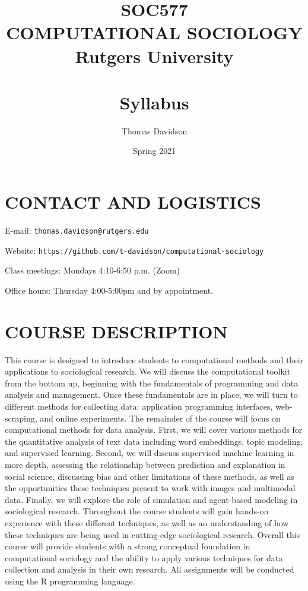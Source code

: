 \documentclass[
  10pt,
]{article}
\title{SOC577\\
\hspace*{0.333em}COMPUTATIONAL SOCIOLOGY\\
Rutgers University\\
~\\
\hspace*{0.333em}Syllabus}
\author{Thomas Davidson}
\date{Spring 2021}
\begin{document}
\maketitle

\hypertarget{contact-and-logistics}{%
\section{CONTACT AND LOGISTICS}\label{contact-and-logistics}}

E-mail: \texttt{thomas.davidson@rutgers.edu}

Website: \texttt{https://github.com/t-davidson/computational-sociology}

Class meetings: Mondays 4:10-6:50 p.m. (Zoom)

Office hours: Thursday 4:00-5:00pm and by appointment.

\hypertarget{course-description}{%
\section{COURSE DESCRIPTION}\label{course-description}}

This course is designed to introduce students to computational methods
and their applications to sociological research. We will discuss the
computational toolkit from the bottom up, beginning with the
fundamentals of programming and data analysis and management. Once these
fundamentals are in place, we will turn to different methods for
collecting data: application programming interfaces, web-scraping, and
online experiments. The remainder of the course will focus on
computational methods for data analysis. First, we will cover various
methods for the quantitative analysis of text data including word
embeddings, topic modeling, and supervised learning. Second, we will
discuss supervised machine learning in more depth, assessing the
relationship between prediction and explanation in social science,
discussing bias and other limitations of these methods, as well as the
opportunities these techniques present to work with images and
multimodal data. Finally, we will explore the role of simulation and
agent-based modeling in sociological research. Throughout the course
students will gain hands-on experience with these different techniques,
as well as an understanding of how these techniques are being used in
cutting-edge sociological research. Overall this course will provide
students with a strong conceptual foundation in computational sociology
and the ability to apply various techniques for data collection and
analysis in their own research. All assignments will be conducted using
the R programming language.
\end{document}
